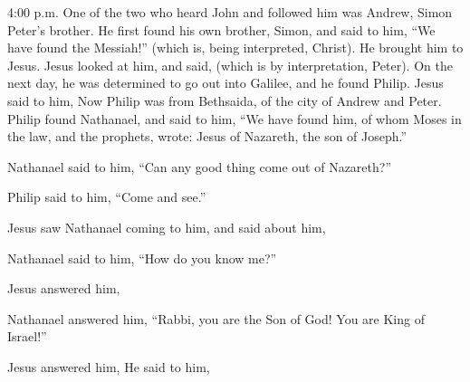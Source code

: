 {{4:00 p.m.}
One of the two who heard John and followed him was Andrew, Simon Peter’s brother.
He first found his own brother, Simon, and said to him, “We have found the Messiah!” (which is, being interpreted, Christ).
He brought him to Jesus. Jesus looked at him, and said,
{} (which is by interpretation, Peter).
On the next day, he was determined to go out into Galilee, and he found Philip. Jesus said to him,
{}
Now Philip was from Bethsaida, of the city of Andrew and Peter.
Philip found Nathanael, and said to him, “We have found him, of whom Moses in the law, and the prophets, wrote: Jesus of Nazareth, the son of Joseph.”
\par }{\PP {}Nathanael said to him, “Can any good thing come out of Nazareth?”
\par }{\PP Philip said to him, “Come and see.”
\par }{\PP {}Jesus saw Nathanael coming to him, and said about him,
{}
\par }{\PP {}Nathanael said to him, “How do you know me?”
\par }{\PP Jesus answered him,
{}
\par }{\PP {}Nathanael answered him, “Rabbi, you are the Son of God! You are King of Israel!”
\par }{\PP {}Jesus answered him,
{}
He said to him,
{}

}
